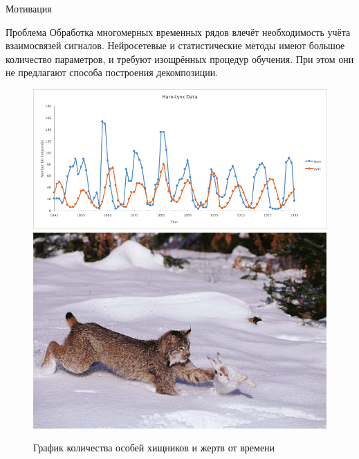 	\begin{frame}{Мотивация}
		
		\begin{alertblock}{Проблема}
			Обработка многомерных временных рядов влечёт необходимость учёта взаимосвязей сигналов. Нейросетевые и статистические методы имеют большое количество параметров, и требуют изощрённых процедур обучения. При этом они не предлагают способа построения декомпозиции.
		\end{alertblock}
		
		\begin{figure}[h]
			\centering
			
			\includegraphics[width=0.69\textheight, keepaspectratio]{img/prey_predetor_graph}
			\includegraphics[width=0.28\textheight, keepaspectratio]{img/hare-lynx.jpg}
			
			\caption{График количества особей хищников и жертв от времени}
			
		\end{figure}
		
	\end{frame}
	
